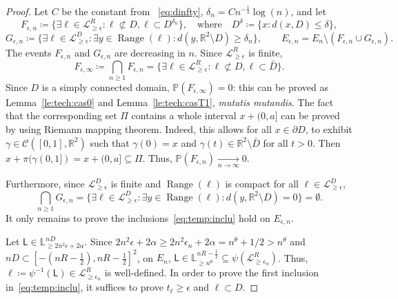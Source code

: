 \documentclass[11pt]{article}
\DeclareMathOperator{\Range}{Range}
\begin{document}
\begin{proof}
    Let $C$ be the constant from ~\eqref{eq:dinfty}, $\delta_n=C n^{-\frac{1}{4}} \log(n)$,   and let
    \[F_{\epsilon,n}\coloneqq \{ \exists \ell\in \mathcal{L}^{R}_{\geq \epsilon}: \ell\not\subset D, \ell \subset D^{\delta_n } \},\quad \text{where}\quad D^\delta\coloneqq\{x: d(x,D)\leq \delta \}, \]
    \[ G_{\epsilon,n}
    \coloneqq \{ \exists \ell\in \mathcal{L}^{D}_{\geq \epsilon}: \exists y \in \Range(\ell): d(y,\mathbb{R}^2 \setminus  D)\geq \delta_n \}, \qquad E_{\epsilon,n}=E_{n}\setminus ( F_{\epsilon,n} \cup G_{\epsilon,n} ).
    \]
    The events $F_{\epsilon,n}$ and $G_{\epsilon,n}$ are decreasing in $n$. Since $\mathcal{L}^{R}_{\geq \epsilon}$ is finite,
    \[
    F_{\epsilon,\infty}\coloneqq \bigcap_{n\geq 1} F_{\epsilon,n}= \{ \exists \ell\in \mathcal{L}^{R}_{\geq \epsilon}: \ell\not\subset D, \ell \subset \bar{D} \}.
    \]
    Since $D$ is a simply connected domain, $\mathbb{P}(F_{\epsilon,\infty})=0$:
    this can be proved as Lemma~\ref{le:tech:cas0} and Lemma~\ref{le:tech:casT1}, {\it mutatis mutandis}. The fact that the corresponding set $\Pi$ contains a whole interval $x+(0,a]$ can be proved by using Riemann mapping theorem. Indeed, this allows for all $x\in \partial D$, to exhibit $\gamma\in\mathcal{C}([0,1],\mathbb{R}^2)$ such that $\gamma(0)=x$ and $\gamma(t)\in \mathbb{R}^2\setminus \bar{D}$ for all $t>0$. Then $x+ \pi(\gamma (0,1])=x+ (0,a] \subseteq \Pi$.
    Thus, $\mathbb{P}(F_{\epsilon,n})\underset{n\to \infty}\longrightarrow 0$.

    Furthermore, since $\mathcal{L}^{D}_{\geq \epsilon}$ is finite and $\Range(\ell)$ is compact for all $\ell \in \mathcal{L}^{D}_{\geq \epsilon}$,
    \[
    \bigcap_{n\geq 1} G_{\epsilon,n} = \{ \exists \ell\in \mathcal{L}^{D}_{\geq \epsilon}: \exists y \in \Range(\ell): d(y,\mathbb{R}^2 \setminus  D )=0 \}=\emptyset.
    \]
    It only remains to prove the inclusions~\eqref{eq:temp:inclu} hold on $E_{\epsilon,n}$.

    Let $\mathsf{L}\in \mathbb{L}^{nD}_{\geq   2 n^2 \epsilon+2\alpha } $. Since
    $2 n^2 \epsilon+2\alpha\geq     2 n^2 \epsilon_n+2\alpha
    =n^\theta+1/2>n^\theta$ and $nD\subset [-(nR-\frac{1}{2}), nR-\frac{1}{2} ]^2$, on $E_{n}$, $\mathsf{L}\in
    \mathbb{L}^{nR-\frac{1}{2} }_{\geq  n^\theta }\subseteq
    \psi( \mathcal{L}_{\geq \epsilon_n}^{R})$. Thus,  $\ell\coloneqq \psi^{-1}(\mathsf{L})\in \mathcal{L}^{R}_{\geq \epsilon_n }$ is well-defined. In order to prove the first inclusion in~\eqref{eq:temp:inclu}, it suffices to prove $t_\ell\geq \epsilon$ and
    $\ell\subset D$.


\end{proof}
\end{document}
